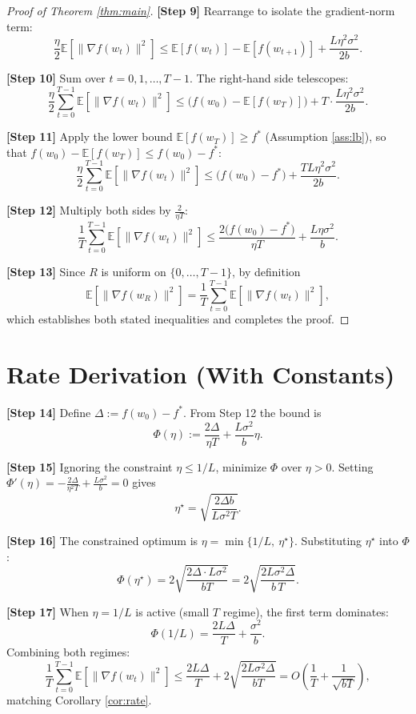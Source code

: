 \documentclass{article}
\begin{document}
\begin{proof}[Proof of Theorem \ref{thm:main}]
\textbf{[Step 9]} Rearrange to isolate the gradient-norm term:
\[
\frac{\eta}{2}\mathbb{E}[\|\nabla f(w_t)\|^2] \leq \mathbb{E}[f(w_t)] - \mathbb{E}[f(w_{t+1})] + \frac{L\eta^2 \sigma^2}{2b}.
\]

\textbf{[Step 10]} Sum over $t = 0, 1, \dots, T-1$. The right-hand side telescopes:
\[
\frac{\eta}{2}\sum_{t=0}^{T-1}\mathbb{E}[\|\nabla f(w_t)\|^2]
\leq \big(f(w_0) - \mathbb{E}[f(w_T)]\big) + T \cdot \frac{L\eta^2 \sigma^2}{2b}.
\]

\textbf{[Step 11]} Apply the lower bound $\mathbb{E}[f(w_T)] \geq f^*$ (Assumption \ref{ass:lb}), so that $f(w_0) - \mathbb{E}[f(w_T)] \leq f(w_0) - f^*$:
\[
\frac{\eta}{2}\sum_{t=0}^{T-1}\mathbb{E}[\|\nabla f(w_t)\|^2]
\leq \big(f(w_0) - f^*\big) + \frac{T L\eta^2 \sigma^2}{2b}.
\]

\textbf{[Step 12]} Multiply both sides by $\frac{2}{\eta T}$:
\[
\frac{1}{T}\sum_{t=0}^{T-1}\mathbb{E}[\|\nabla f(w_t)\|^2]
\leq \frac{2\big(f(w_0) - f^*\big)}{\eta T} + \frac{L\eta \sigma^2}{b}.
\]

\textbf{[Step 13]} Since $R$ is uniform on $\{0,\dots,T-1\}$, by definition
\[
\mathbb{E}[\|\nabla f(w_R)\|^2] = \frac{1}{T}\sum_{t=0}^{T-1}\mathbb{E}[\|\nabla f(w_t)\|^2],
\]
which establishes both stated inequalities and completes the proof.
\end{proof}

\section*{Rate Derivation (With Constants)}

\textbf{[Step 14]} Define $\Delta := f(w_0) - f^*$. From Step 12 the bound is
\[
\Phi(\eta) := \frac{2\Delta}{\eta T} + \frac{L\sigma^2}{b}\eta.
\]

\textbf{[Step 15]} Ignoring the constraint $\eta \le 1/L$, minimize $\Phi$ over $\eta>0$. Setting $\Phi'(\eta) = -\frac{2\Delta}{\eta^2 T} + \frac{L\sigma^2}{b} = 0$ gives
\[
\eta^\star = \sqrt{\frac{2\Delta b}{L\sigma^2 T}}.
\]

\textbf{[Step 16]} The constrained optimum is $\eta = \min\{1/L,\ \eta^\star\}$. Substituting $\eta^\star$ into $\Phi$:
\[
\Phi(\eta^\star) = 2\sqrt{\frac{2\Delta \cdot L\sigma^2}{bT}} = 2\sqrt{\frac{2 L \sigma^2 \Delta}{b\,T}}.
\]

\textbf{[Step 17]} When $\eta = 1/L$ is active (small $T$ regime), the first term dominates:
\[
\Phi(1/L) = \frac{2L\Delta}{T} + \frac{\sigma^2}{b}.
\]
Combining both regimes:
\[
\frac{1}{T}\sum_{t=0}^{T-1}\mathbb{E}[\|\nabla f(w_t)\|^2]
\leq \frac{2L\Delta}{T} + 2\sqrt{\frac{2L\sigma^2 \Delta}{bT}}
= O\!\left(\frac{1}{T} + \frac{1}{\sqrt{bT}}\right),
\]
matching Corollary \ref{cor:rate}.
\end{document}
